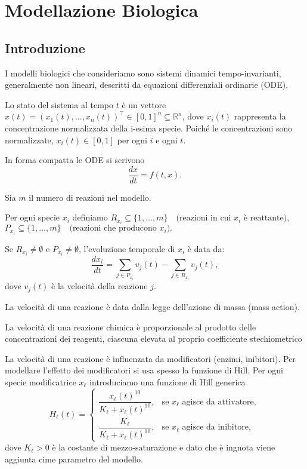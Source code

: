 \chapter{Modellazione Biologica}

\section{Introduzione}

I modelli biologici che consideriamo sono sistemi dinamici tempo-invarianti, generalmente non lineari, descritti da equazioni differenziali ordinarie (ODE).

Lo stato del sistema al tempo \(t\) è un vettore \(x(t) = (x_1(t),\dots,x_n(t))^\top \in [0,1]^n \subseteq \mathbb{R}^n\), dove \(x_i(t)\) rappresenta la concentrazione normalizzata della i-esima specie. Poiché le concentrazioni sono normalizzate, \(x_i(t)\in[0,1]\) per ogni \(i\) e ogni \(t\).

In forma compatta le ODE si scrivono
\[
\frac{dx}{dt} = f(t,x).
\]

Sia \(m\) il numero di reazioni nel modello.

Per ogni specie \(x_i\) definiamo
$R_{x_i} \subseteq \{1,\dots,m\}\quad\text{(reazioni in cui \(x_i\) è reattante)}$,
$P_{x_i} \subseteq \{1,\dots,m\}\quad\text{(reazioni che producono \(x_i\))}.$

Se \(R_{x_i}\neq\emptyset\) e \(P_{x_i}\neq\emptyset\), l'evoluzione temporale di \(x_i\) è data da:
\[
\frac{dx_i}{dt}=\sum_{j\in P_{x_i}} v_j(t) - \sum_{j\in R_{x_i}} v_j(t),
\]
dove \(v_j(t)\) è la velocità della reazione \(j\).

La velocità di una reazione è data dalla legge dell'azione di massa (mass action).

La velocità di una reazione chimica è proporzionale al prodotto delle concentrazioni dei reagenti, ciascuna elevata al proprio coefficiente stechiometrico

La velocità di una reazione è influenzata da modificatori (enzimi, inibitori). Per modellare l'effetto dei modificatori si usa spesso la funzione di Hill. Per ogni specie modificatrice \(x_\ell\) introduciamo una funzione di Hill generica
\[
H_\ell(t) =
\begin{cases}
\dfrac{x_\ell(t)^{10}}{K_\ell + x_\ell(t)^{10}}, &\text{se \(x_\ell\) agisce da attivatore},\\[8pt]
\dfrac{K_\ell}{K_\ell + x_\ell(t)^{10}}, &\text{se \(x_\ell\) agisce da inibitore},
\end{cases}
\]
dove \(K_\ell>0\) è la costante di mezzo-saturazione e dato che è ingnota viene aggiunta cime parametro del modello.

